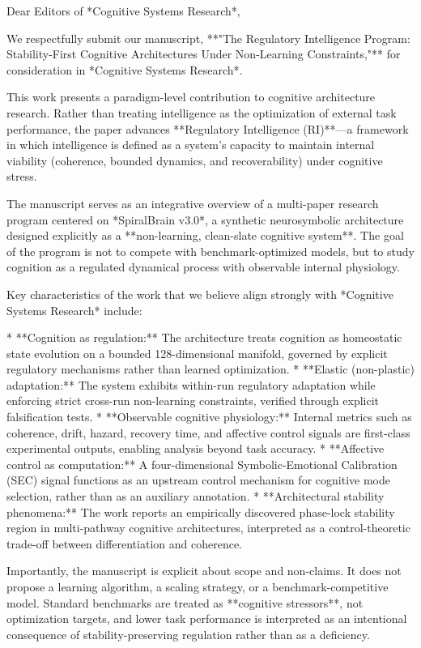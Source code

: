 Dear Editors of *Cognitive Systems Research*,

We respectfully submit our manuscript, **"The Regulatory Intelligence Program: Stability-First Cognitive Architectures Under Non-Learning Constraints,"** for consideration in *Cognitive Systems Research*.

This work presents a paradigm-level contribution to cognitive architecture research. Rather than treating intelligence as the optimization of external task performance, the paper advances **Regulatory Intelligence (RI)**—a framework in which intelligence is defined as a system's capacity to maintain internal viability (coherence, bounded dynamics, and recoverability) under cognitive stress.

The manuscript serves as an integrative overview of a multi-paper research program centered on *SpiralBrain v3.0*, a synthetic neurosymbolic architecture designed explicitly as a **non-learning, clean-slate cognitive system**. The goal of the program is not to compete with benchmark-optimized models, but to study cognition as a regulated dynamical process with observable internal physiology.

Key characteristics of the work that we believe align strongly with *Cognitive Systems Research* include:

* **Cognition as regulation:** The architecture treats cognition as homeostatic state evolution on a bounded 128-dimensional manifold, governed by explicit regulatory mechanisms rather than learned optimization.
* **Elastic (non-plastic) adaptation:** The system exhibits within-run regulatory adaptation while enforcing strict cross-run non-learning constraints, verified through explicit falsification tests.
* **Observable cognitive physiology:** Internal metrics such as coherence, drift, hazard, recovery time, and affective control signals are first-class experimental outputs, enabling analysis beyond task accuracy.
* **Affective control as computation:** A four-dimensional Symbolic-Emotional Calibration (SEC) signal functions as an upstream control mechanism for cognitive mode selection, rather than as an auxiliary annotation.
* **Architectural stability phenomena:** The work reports an empirically discovered phase-lock stability region in multi-pathway cognitive architectures, interpreted as a control-theoretic trade-off between differentiation and coherence.

Importantly, the manuscript is explicit about scope and non-claims. It does not propose a learning algorithm, a scaling strategy, or a benchmark-competitive model. Standard benchmarks are treated as **cognitive stressors**, not optimization targets, and lower task performance is interpreted as an intentional consequence of stability-preserving regulation rather than as a deficiency.

